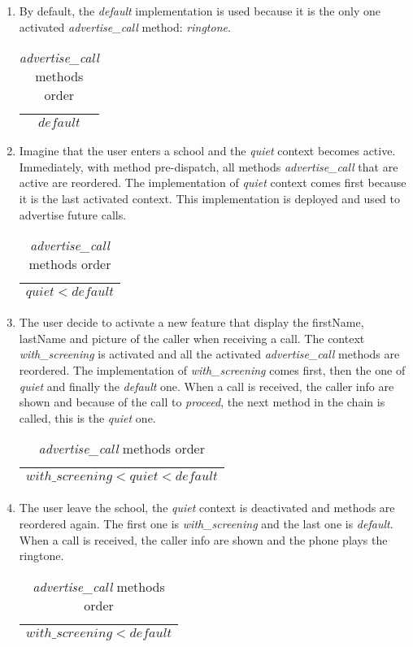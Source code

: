 \begin{enumerate}
\item By default, the \textit{default} implementation is used because it is the only one activated \textit{advertise\_call} method: \textit{ringtone}.
\begin{table}[!ht]
\centering
\begin{tabular}{|c|}
\hline
$$default$$
\\ \hline
\end{tabular}
\caption{\textit{advertise\_call} methods order}
\end{table}

\item Imagine that the user enters a school and the \textit{quiet} context becomes active.
Immediately, with method pre-dispatch, all methods \textit{advertise\_call} that are active are reordered. The implementation of \textit{quiet} context comes first because it is the last activated context. This implementation is deployed and used to advertise future calls.
\begin{table}[!ht]
\centering
\begin{tabular}{|c|}
\hline
$$quiet < default$$
\\ \hline
\end{tabular}
\caption{\textit{advertise\_call} methods order}
\end{table}

\item The user decide to activate a new feature that display the firstName, lastName and picture of the caller when receiving a call. The context \textit{with\_screening} is activated and all the activated \textit{advertise\_call} methods are reordered.
The implementation of \textit{with\_screening} comes first, then the one of \textit{quiet} and finally the \textit{default} one.
When a call is received, the caller info are shown and because of the call to \textit{proceed}, the next method in the chain is called, this is the \textit{quiet} one.
\begin{table}[!ht]
\centering
\begin{tabular}{|c|}
\hline
$$with\_screening < quiet < default$$
\\ \hline
\end{tabular}
\caption{\textit{advertise\_call} methods order}
\end{table}

\item The user leave the school, the \textit{quiet} context is deactivated and methods are reordered again. The first one is \textit{with\_screening} and the last one is \textit{default}. When a call is received, the caller info are shown and the phone plays the ringtone.
\begin{table}[!ht]
\centering
\begin{tabular}{|c|}
\hline
$$with\_screening < default$$
\\ \hline
\end{tabular}
\caption{\textit{advertise\_call} methods order}
\end{table}

\end{enumerate}
